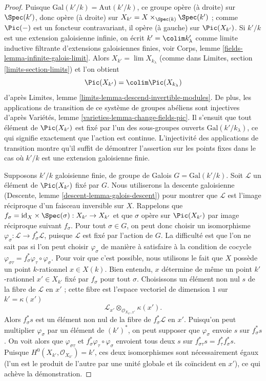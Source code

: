 \begin{proof}
Puisque $\text{Gal}(k'/k) = \text{Aut}(k'/k)$, ce groupe opère (à droite)
sur $\Spec(k')$, donc opère (à droite) sur
$X_{k'} = X \times_{\Spec(k)} \Spec(k')$ ; comme $\Pic(-)$
est un foncteur contravariant, il opère (à gauche) sur $\Pic(X_{k'})$.
Si $k'/k$ est une extension galoisienne infinie, on écrit
$k' = \colim k'_\lambda$ comme limite inductive filtrante d'extensions galoisiennes
finies, voir Corps, lemme \ref{fields-lemma-infinite-galois-limit}.
Alors $X_{k'} = \lim X_{k_\lambda}$
(comme dans Limites, section \ref{limits-section-limits})
et l'on obtient
$$
\Pic(X_{k'}) = \colim \Pic(X_{k_\lambda})
$$
d'après Limites, lemme \ref{limits-lemma-descend-invertible-modules}.
De plus, les applications de transition de ce système de groupes abéliens
sont injectives d'après Variétés, lemme \ref{varieties-lemma-change-fields-pic}.
Il s'ensuit que tout élément de $\Pic(X_{k'})$ est fixé par
l'un des sous-groupes ouverts $\text{Gal}(k'/k_\lambda)$, ce qui signifie exactement
que l'action est continue. L'injectivité des applications de transition
montre qu'il suffit de démontrer l'assertion sur les points fixes dans le
cas où $k'/k$ est une extension galoisienne finie.

\medskip\noindent
Supposons $k'/k$ galoisienne finie, de groupe de Galois $G = \text{Gal}(k'/k)$.
Soit $\mathcal{L}$ un élément de $\Pic(X_{k'})$ fixé par $G$.
Nous utiliserons la descente galoisienne (Descente, lemme \ref{descent-lemma-galois-descent})
pour montrer que $\mathcal{L}$ est l'image réciproque d'un faisceau inversible sur $X$.
Rappelons que $f_\sigma = \text{id}_X \times \Spec(\sigma) : X_{k'} \to X_{k'}$
et que $\sigma$ opère sur $\Pic(X_{k'})$ par image réciproque suivant $f_\sigma$.
Pour tout $\sigma \in G$, on peut donc choisir un isomorphisme
$\varphi_\sigma : \mathcal{L} \to f_\sigma^*\mathcal{L}$,
puisque $\mathcal{L}$ est fixé par l'action de $G$.
La difficulté est que l'on ne sait pas si l'on peut choisir
$\varphi_\sigma$ de manière à satisfaire à la condition de cocycle
$\varphi_{\sigma\tau} = f_\sigma^*\varphi_\tau \circ \varphi_\sigma$.
Pour voir que c'est possible, nous utilisons le fait que $X$ possède un point $k$-rationnel
$x \in X(k)$. Bien entendu, $x$ détermine de même un point $k'$-rationnel
$x' \in X_{k'}$ fixé par $f_\sigma$ pour tout $\sigma$.
Choisissons un élément non nul $s$ de la fibre de $\mathcal{L}$ en $x'$ ;
cette fibre est l'espace vectoriel de dimension $1$ sur $k' = \kappa(x')$
$$
\mathcal{L}_{x'} \otimes_{\mathcal{O}_{X_{k'}, x'}} \kappa(x').
$$
Alors $f_\sigma^*s$ est un élément non nul de la fibre de
$f_\sigma^*\mathcal{L}$ en $x'$. Puisqu'on peut multiplier $\varphi_\sigma$
par un élément de $(k')^*$, on peut supposer que $\varphi_\sigma$ envoie
$s$ sur $f_\sigma^*s$. On voit alors que $\varphi_{\sigma\tau}$ et
$f_\sigma^*\varphi_\tau \circ \varphi_\sigma$
envoient tous deux $s$ sur $f_{\sigma\tau}^*s = f_\tau^*f_\sigma^*s$.
Puisque $H^0(X_{k'}, \mathcal{O}_{X_{k'}}) = k'$, ces deux isomorphismes
sont nécessairement égaux (l'un est le produit de l'autre par une unité globale
et ils coïncident en $x'$), ce qui achève la démonstration.
\end{proof}

